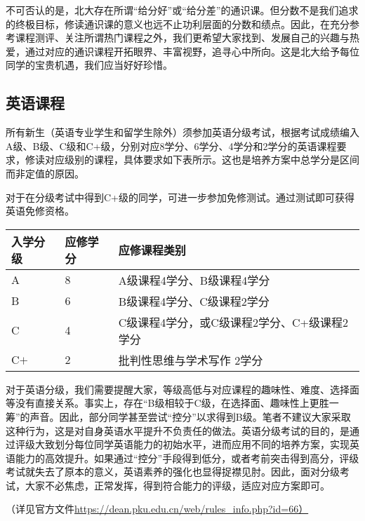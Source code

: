\documentclass[11pt,oneside]{book}
\begin{document}
不可否认的是，北大存在所谓“给分好”或“给分差”的通识课。但分数不是我们追求的终极目标，修读通识课的意义也远不止功利层面的分数和绩点。因此，在充分参考课程测评、关注所谓热门课程之外，我们更希望大家找到、发展自己的兴趣与热爱，通过对应的通识课程开拓眼界、丰富视野，追寻心中所向。这是北大给予每位同学的宝贵机遇，我们应当好好珍惜。

\subsection{英语课程}
所有新生（英语专业学生和留学生除外）须参加英语分级考试，根据考试成绩编入A级、B级、C级和C+级，分别对应8学分、6学分、4学分和2学分的英语课程要求，修读对应级别的课程，具体要求如下表所示。这也是培养方案中总学分是区间而非定值的原因。

对于在分级考试中得到C+级的同学，可进一步参加免修测试。通过测试即可获得英语免修资格。

\begin{table}[htbp]
	\centering
	
	\begin{tabular}{| l | l | l |}
		\hline
		入学分级 & 应修学分 & 应修课程类别 \\
		\hline
		A & 8 & A级课程4学分、B级课程4学分 \\
		\hline
		B & 6 & B级课程4学分、C级课程2学分 \\
		\hline
		C & 4 & C级课程4学分，或C级课程2学分、C+级课程2学分 \\
		\hline
		C$+$  & 2 & 批判性思维与学术写作\hspace{6pt} 2学分 \\
		\hline
		
	\end{tabular}
	
\end{table}

对于英语分级，我们需要提醒大家，等级高低与对应课程的趣味性、难度、选择面等没有直接关系。事实上，存在“B级相较于C级，在选择面、趣味性上更胜一筹”的声音。因此，部分同学甚至尝试“控分”以求得到B级。笔者不建议大家采取这种行为，这是对自身英语水平提升不负责任的做法。英语分级考试的目的，是通过评级大致划分每位同学英语能力的初始水平，进而应用不同的培养方案，实现英语能力的高效提升。如果通过“控分”手段得到低分，或者考前突击得到高分，评级考试就失去了原本的意义，英语素养的强化也显得捉襟见肘。因此，面对分级考试，大家不必焦虑，正常发挥，得到符合能力的评级，适应对应方案即可。

（详见官方文件\href{https://dean.pku.edu.cn/web/rules_info.php?id=66\%EF\%BC\%89}{https://dean.pku.edu.cn/web/rules\_info.php?id=66）}
\end{document}
